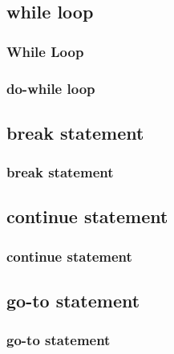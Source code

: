 \documentclass[hyperref={pdfpagelabels=true}]{beamer}
\begin{document}
\subsection{while loop}
\begin{frame}
\frametitle{While Loop}
\begin{tcolorbox}[title=Custom Count Down,width=9.85 cm]

\end{tcolorbox}
\end{frame}

\begin{frame}
\frametitle{do-while loop}
\begin{tcolorbox}[title=   ,width=9.85 cm]

\end{tcolorbox}
\end{frame}

\subsection{break statement}

\begin{frame}
\frametitle{break statement}
\begin{tcolorbox}[title=,width=9.85 cm]

\end{tcolorbox}
\end{frame}

\subsection{continue statement}

\begin{frame}
\frametitle{continue statement}
\begin{tcolorbox}[title= ,width=9.85 cm]

\end{tcolorbox}
\end{frame}

\subsection{go-to statement}

\begin{frame}
\frametitle{go-to statement}
\scriptsize{
\begin{tcolorbox}[title=  ,width=9.85 cm]

\end{tcolorbox}}
\end{frame}
\end{document}
